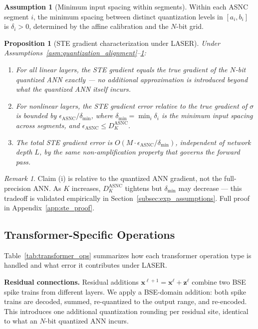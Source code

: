 \documentclass{article}
\theoremstyle{plain}
\newtheorem{proposition}[theorem]{Proposition}
\theoremstyle{definition}
\newtheorem{assumption}[theorem]{Assumption}
\theoremstyle{remark}
\newtheorem{remark}[theorem]{Remark}
\begin{document}
\begin{assumption}[Minimum input spacing within segments]
\label{asm:input_spacing}
Within each ASNC segment $i$, the minimum spacing between distinct quantization levels in $[a_i, b_i]$ is $\delta_i > 0$, determined by the affine calibration and the $N$-bit grid.
\end{assumption}

\begin{proposition}[STE gradient characterization under LASER]
\label{prop:ste_main}
Under Assumptions~\ref{asm:quantization_alignment}--\ref{asm:input_spacing}:
\begin{enumerate}
  \item For all linear layers, the STE gradient equals the true gradient of the
        \emph{$N$-bit quantized ANN} exactly — no additional approximation is
        introduced beyond what the quantized ANN itself incurs.
  \item For nonlinear layers, the STE gradient error relative to the true gradient
        of $\sigma$ is bounded by $\epsilon_{\mathrm{ASNC}} / \delta_{\min}$,
        where $\delta_{\min} = \min_i \delta_i$ is the minimum input spacing
        across segments, and $\epsilon_{\mathrm{ASNC}} \le D_K^{\mathrm{ASNC}}$.
  \item The total STE gradient error is $O(M \cdot \epsilon_{\mathrm{ASNC}} /
        \delta_{\min})$, independent of network depth $L$, by the same
        non-amplification property that governs the forward pass.
\end{enumerate}
\end{proposition}

\begin{remark}
Claim (i) is relative to the quantized ANN gradient, not the full-precision ANN. As $K$ increases, $D_K^{\mathrm{ASNC}}$ tightens but $\delta_{\min}$ may decrease — this tradeoff is validated empirically in Section~\ref{subsec:exp_assumptions}. Full proof in Appendix~\ref{app:ste_proof}.
\end{remark}

\subsection{Transformer-Specific Operations}
\label{subsec:transformer_ops}

Table~\ref{tab:transformer_ops} summarizes how each transformer operation type is handled and what error it contributes under LASER.

\noindent\textbf{Residual connections.}
Residual additions $\mathbf{x}^{\ell+1} = \mathbf{x}^\ell + \mathbf{z}^\ell$ combine two BSE spike trains from different layers. We apply a BSE-domain addition: both spike trains are decoded, summed, re-quantized to the output range, and re-encoded. This introduces one additional quantization rounding per residual site, identical to what an $N$-bit quantized ANN incurs.
\end{document}
